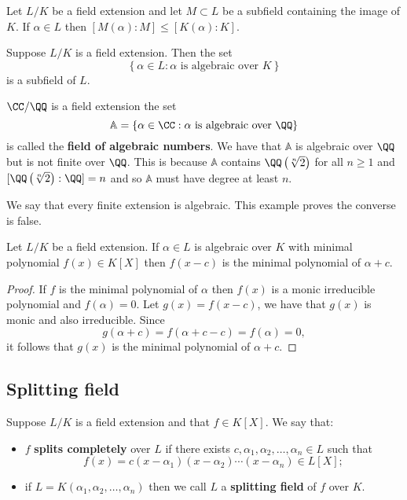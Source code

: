 \documentclass[12pt, a4paper]{article}
\begin{document}
\begin{lemma}
    Let \(L/K\) be a field extension and let \(M \subset L\) be a subfield containing the image of \(K\). If \(\alpha \in L\) then \([M(\alpha):M]\leq [K(\alpha):K]\).
\end{lemma}

\begin{mdcor}
    Suppose \(L/K\) is a field extension. Then the set 
    \[\left\{ \alpha\in L : \alpha \text{ is algebraic over } K \right\}\]
    is a subfield of \(L\).
\end{mdcor}

\begin{mdexample}
    \(\CC/\QQ\) is a field extension the set 
    \[\mathbb{A}=\left\{ \alpha \in \CC : \alpha \text{ is algebraic over \(\QQ\)} \right\}\]
    is called the \textbf{field of algebraic numbers}. We have that \(\mathbb{A}\) is algebraic over \(\QQ\) but is not finite over \(\QQ\). This is because \(\mathbb{A}\) contains \(\QQ\left(\sqrt[n]{2}\right)\) for all \(n\geq 1\) and \([\QQ\left( \sqrt[n]{2} \right):\QQ]=n\) and so \(\mathbb{A}\) must have degree at least \(n\). 
\end{mdexample}

\begin{mdnote}
    We say that every finite extension is algebraic. This example proves the converse is false.
\end{mdnote}

\begin{mdprop}
    Let \(L/K\) be a field extension. If \(\alpha \in L\) is algebraic over \(K\) with minimal polynomial \(f(x) \in K[X]\) then \(f(x-c)\) is the minimal polynomial of \(\alpha+c\).
\end{mdprop}

\begin{proof}
    If \(f\) is the minimal polynomial of \(\alpha\) then \(f(x)\) is a monic irreducible polynomial and \(f(\alpha)=0\). Let \(g(x)=f(x-c)\), we have that \(g(x)\) is monic and also irreducible. Since 
    \[g(\alpha+c)=f(\alpha+c-c)=f(\alpha)=0,\]
    it follows that \(g(x)\) is the minimal polynomial of \(\alpha+c\).
\end{proof}

\subsection{Splitting field}

\begin{definition}
    Suppose \(L/K\) is a field extension and that \(f\in K[X]\). We say that:
    \begin{itemize}
        \item \(f\) \textbf{splits completely} over \(L\) if there exists \(c,\alpha_1,\alpha_2,\ldots,\alpha_n \in L\) such that 
        \[f(x)=c(x-\alpha_1)(x-\alpha_2)\cdots(x-\alpha_n) \in L[X];\]
        \item if \(L=K(\alpha_1,\alpha_2,\ldots,\alpha_n)\) then we call \(L\) a \textbf{splitting field} of \(f\) over \(K\).
    \end{itemize}
\end{definition}
\end{document}

